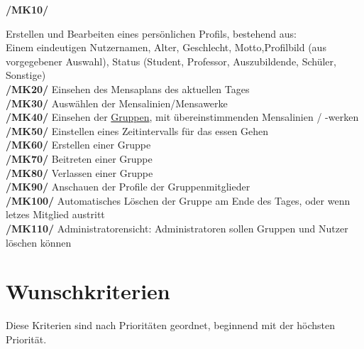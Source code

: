 \documentclass[a4paper]{scrreprt}
\begin{document}
\begin{addmargin}[25pt]{0pt}
\hypertarget{mk10}{\textbf{/MK10/}} Erstellen und Bearbeiten eines persönlichen Profils, bestehend aus: \\ Einem eindeutigen Nutzernamen, Alter, Geschlecht, Motto,Profilbild (aus vorgegebener Auswahl), Status (Student, Professor, Auszubildende, Schüler, Sonstige)\\
\hypertarget{mk20}{\textbf{/MK20/}} Einsehen des Mensaplans des aktuellen Tages\\
\hypertarget{mk30}{\textbf{/MK30/}} Auswählen der Mensalinien/Mensawerke\\
\hypertarget{mk40}{\textbf{/MK40/}} Einsehen der \hyperlink{gruppe}{Gruppen}, mit übereinstimmenden Mensalinien / -werken\\
\hypertarget{mk50}{\textbf{/MK50/}} Einstellen eines Zeitintervalls für das essen Gehen \\
\hypertarget{mk60}{\textbf{/MK60/}} Erstellen einer Gruppe\\
\hypertarget{mk70}{\textbf{/MK70/}} Beitreten einer Gruppe\\
\hypertarget{mk80}{\textbf{/MK80/}} Verlassen einer Gruppe\\
\hypertarget{mk90}{\textbf{/MK90/}} Anschauen der Profile der Gruppenmitglieder\\
\hypertarget{mk100}{\textbf{/MK100/}} Automatisches Löschen der Gruppe am Ende des Tages, oder wenn letzes Mitglied austritt\\
\hypertarget{mk110}{\textbf{/MK110/}} Administratorensicht: Administratoren sollen Gruppen und Nutzer löschen können\\
\end{addmargin}

\section{Wunschkriterien}
Diese Kriterien sind nach Prioritäten geordnet, beginnend mit der höchsten Priorität.\\
\end{document}
